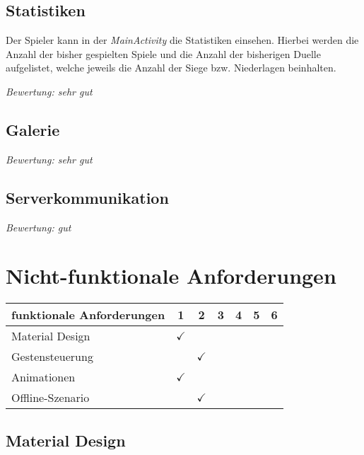 \subsection{Statistiken}

Der Spieler kann in der \emph{MainActivity} die Statistiken einsehen. Hierbei werden die Anzahl der bisher gespielten Spiele und die Anzahl der bisherigen Duelle aufgelistet, welche jeweils die Anzahl der Siege bzw. Niederlagen beinhalten.

\vspace{5mm}
\emph{Bewertung: sehr gut}
\vspace{5mm}

\subsection{Galerie}

\vspace{5mm}
\emph{Bewertung: sehr gut}
\vspace{5mm}

\subsection{Serverkommunikation}

\vspace{5mm}
\emph{Bewertung: gut}
\vspace{5mm}

\section{Nicht-funktionale Anforderungen}
\label{sec:abgleich_nichtfunktionaleanforderungen}

\begin{table}[ht]
\centering
\begin{tabular}{l|c c c c c c}
funktionale Anforderungen & 1 & 2 & 3 & 4 & 5 & 6 \\ \hline\hline
Material Design & $\checkmark$ &  &  &  &  &   \\
Gestensteuerung &  & $\checkmark$  &  &  &  & \\
Animationen & $\checkmark$ &  &  &  &  & \\
Offline-Szenario & & $\checkmark$  &  &  &  &
\end{tabular}
\label{tab:abgleich_nichtfunktionaleanforderungen}
\end{table}

\subsection{Material Design}

